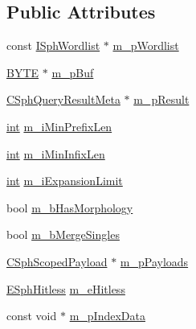 \subsection*{Public Attributes}
\begin{DoxyCompactItemize}
\item 
const \hyperlink{classISphWordlist}{I\-Sph\-Wordlist} $\ast$ \hyperlink{structExpansionContext__t_a4929d0871e2ff2d3c7e86d8361bf7d34}{m\-\_\-p\-Wordlist}
\item 
\hyperlink{sphinxstd_8h_a4ae1dab0fb4b072a66584546209e7d58}{B\-Y\-T\-E} $\ast$ \hyperlink{structExpansionContext__t_a474b0a38cffd586a3f90eb79d2386abf}{m\-\_\-p\-Buf}
\item 
\hyperlink{classCSphQueryResultMeta}{C\-Sph\-Query\-Result\-Meta} $\ast$ \hyperlink{structExpansionContext__t_aa81ebe53d13c706ee646ee0a042189e2}{m\-\_\-p\-Result}
\item 
\hyperlink{sphinxexpr_8cpp_a4a26e8f9cb8b736e0c4cbf4d16de985e}{int} \hyperlink{structExpansionContext__t_a5b628092f91383a79edb7ff23b297a62}{m\-\_\-i\-Min\-Prefix\-Len}
\item 
\hyperlink{sphinxexpr_8cpp_a4a26e8f9cb8b736e0c4cbf4d16de985e}{int} \hyperlink{structExpansionContext__t_a989577b58d6577e35ff9a6fecb1b2ef4}{m\-\_\-i\-Min\-Infix\-Len}
\item 
\hyperlink{sphinxexpr_8cpp_a4a26e8f9cb8b736e0c4cbf4d16de985e}{int} \hyperlink{structExpansionContext__t_aa6b4a9b2f785025e6d40a152d24eef2d}{m\-\_\-i\-Expansion\-Limit}
\item 
bool \hyperlink{structExpansionContext__t_a355c3f590ee62e15252921e19654e2eb}{m\-\_\-b\-Has\-Morphology}
\item 
bool \hyperlink{structExpansionContext__t_a65aff2cb26716732b52a30e3d9fa284c}{m\-\_\-b\-Merge\-Singles}
\item 
\hyperlink{classCSphScopedPayload}{C\-Sph\-Scoped\-Payload} $\ast$ \hyperlink{structExpansionContext__t_aeb2431271f504076c4f20ffcb1f7e5e1}{m\-\_\-p\-Payloads}
\item 
\hyperlink{sphinx_8h_a1920852c5151009d65cf2bc8204a685b}{E\-Sph\-Hitless} \hyperlink{structExpansionContext__t_a69648970e837ddf5e99e1ab4ca74c33f}{m\-\_\-e\-Hitless}
\item 
const void $\ast$ \hyperlink{structExpansionContext__t_a940b69a7e764d4d624d91b5cdfac0704}{m\-\_\-p\-Index\-Data}
\end{DoxyCompactItemize}



